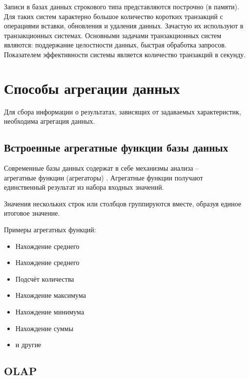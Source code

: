 Записи в базах данных строкового типа представляются построчно (в памяти). 
Для таких систем характерно большое количество коротких транзакций с операциями вставки, 
обновления и удаления данных. Зачастую их используют в транзакционных системах.
Основными задачами транзакционных систем являются: поддержание целостности данных, быстрая обработка запросов. Показателем эффективности системы является количество транзакций в секунду.

\section{Способы агрегации данных}

Для сбора информации о результатах, зависящих от задаваемых характеристик, необходима агрегация данных.

\subsection{Встроенные агрегатные функции базы данных}

Современные базы данных содержат в себе механизмы анализа -- \\ 
агрегатные функции (агрегаторы) \cite{agr-f}.
Агрегатные функции получают \\ единственный результат из набора входных значений. 

Значения нескольких строк или столбцов группируются вместе, образуя единое итоговое значение.

Примеры агрегатных функций:
\begin{itemize}
	\item Нахождение среднего
	
	\item Нахождение среднего
	
	\item Подсчёт количества
	
	\item Нахождение максимума
	
	\item Нахождение минимума
	
	\item Нахождение суммы
	
	\item и другие
\end{itemize}

\newpage

\subsection{OLAP}


